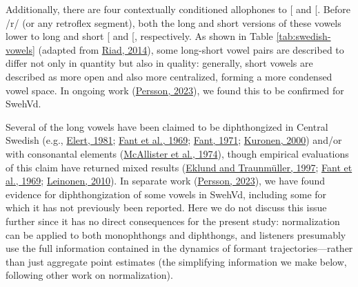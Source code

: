 \documentclass[utf8]{frontiersSCNS}
\begin{document}
Additionally, there are four contextually conditioned allophones to {[}\ipatext{ɛ}{]} and {[}\ipatext{ø}{]}. Before /r/ (or any retroflex segment), both the long and short versions of these vowels lower to long and short {[}\ipatext{æ}{]} and {[}\ipatext{œ}{]}, respectively. As shown in Table \ref{tab:swedish-vowels} (adapted from \protect\hyperlink{ref-riad2014}{Riad, 2014}), some long-short vowel pairs are described to differ not only in quantity but also in quality: generally, short vowels are described as more open and also more centralized, forming a more condensed vowel space. In ongoing work (\protect\hyperlink{ref-persson2023}{Persson, 2023}), we found this to be confirmed for SwehVd.

Several of the long vowels have been claimed to be diphthongized in Central Swedish (e.g., \protect\hyperlink{ref-elert1981}{Elert, 1981}; \protect\hyperlink{ref-fant1969}{Fant et al., 1969}; \protect\hyperlink{ref-fant1971}{Fant, 1971}; \protect\hyperlink{ref-kuronen2000}{Kuronen, 2000}) and/or with consonantal elements (\protect\hyperlink{ref-mcallister1974}{McAllister et al., 1974}), though empirical evaluations of this claim have returned mixed results (\protect\hyperlink{ref-eklund1997}{Eklund and Traunmüller, 1997}; \protect\hyperlink{ref-fant1969}{Fant et al., 1969}; \protect\hyperlink{ref-leinonen2010}{Leinonen, 2010}). In separate work (\protect\hyperlink{ref-persson2023}{Persson, 2023}), we have found evidence for diphthongization of some vowels in SwehVd, including some for which it has not previously been reported. Here we do not discuss this issue further since it has no direct consequences for the present study: normalization can be applied to both monophthongs and diphthongs, and listeners presumably use the full information contained in the dynamics of formant trajectories---rather than just aggregate point estimates (the simplifying information we make below, following other work on normalization).
\end{document}
